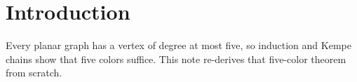 \section{Introduction}\label{sec:intro}
Every planar graph has a vertex of degree at most five, so induction and Kempe chains show that five colors suffice.
This note re-derives that five-color theorem from scratch.
